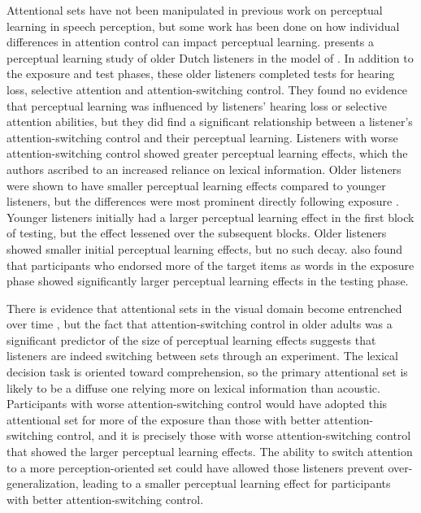 Attentional sets have not been manipulated in previous work on perceptual learning in speech perception, but some work has been done on how individual differences in attention control can impact perceptual learning.
\citet{Scharenborg2014} presents a perceptual learning study of older Dutch listeners in the model of \citet{Norris2003}.  
In addition to the exposure and test phases, these older listeners completed tests for hearing loss, selective attention and attention-switching control.  
They found no evidence that perceptual learning was influenced by listeners' hearing loss or selective attention abilities, but they did find a significant relationship between a listener's attention-switching control and their perceptual learning.  
Listeners with worse attention-switching control showed greater perceptual learning effects, which the authors ascribed to an increased reliance on lexical information.  
Older listeners were shown to have smaller perceptual learning effects compared to younger listeners, but the differences were most prominent directly following exposure \citep{Scharenborg2013}.  
Younger listeners initially had a larger perceptual learning effect in the first block of testing, but the effect lessened over the subsequent blocks.  
Older listeners showed smaller initial perceptual learning effects, but no such decay.  
\citet{Scharenborg2013} also found that participants who endorsed more of the target items as words in the exposure phase showed significantly larger perceptual learning effects in the testing phase.

There is evidence that attentional sets in the visual domain become entrenched over time \cite{Leber2006}, but the fact that attention-switching control in older adults was a significant predictor of the size of perceptual learning effects \citep{Scharenborg2014} suggests that listeners are indeed switching between sets through an experiment.
The lexical decision task is oriented toward comprehension, so the primary attentional set is likely to be a diffuse one relying more on lexical information than acoustic.
Participants with worse attention-switching control would have adopted this attentional set for more of the exposure than those with better attention-switching control, and it is precisely those with worse attention-switching control that showed the larger perceptual learning effects.
The ability to switch attention to a more perception-oriented set could have allowed those listeners prevent over-generalization, leading to a smaller perceptual learning effect for participants with better attention-switching control.

